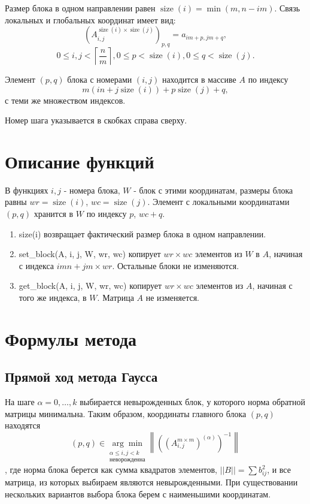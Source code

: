 \documentclass[a4paper,12pt]{article}
\newcommand{\br}[1]{\left(#1\right)}
\begin{document}
Размер блока в одном направлении равен $\operatorname{size}(i) = \min(m, n - i m)$. Связь локальных и глобальных координат имеет вид:
\[
    \left(A_{i, j}^{\operatorname{size}(i) \times \operatorname{size}(j)} \right)_{p, q} = a_{i m + p, j m + q},
\]
\[
    0 \leq i, j < \left\lceil \frac{n}{m} \right\rceil, 0 \leq p < \operatorname{size}(i), 0 \leq q < \operatorname{size}(j).
\]

Элемент $(p, q)$ блока с номерами $(i, j)$ находится в массиве $A$ по индексу
\[
    m (i n + j \operatorname{size}(i)) + p \operatorname{size}(j) + q,
\]
с теми же множеством индексов.

Номер шага указывается в скобках справа сверху.

\section{Описание функций}
В функциях $i, j$ - номера блока, $W$ - блок с этими координатам, размеры блока равны $wr = \operatorname{size}(i)$, $wc = \operatorname{size}(j)$. Элемент с локальными координатами $(p, q)$ хранится в $W$ по индексу $p$, $wc + q$.

\begin{enumerate}
    \item size(i) возвращает фактический размер блока в одном направлении.
    \item set\_block(A, i, j, W, wr, wc) копирует $wr \times wc$ элементов из $W$ в $A$, начиная с индекса $i m n + j m \times wr$. Остальные блоки не изменяются.
    \item get\_block(A, i, j, W, wr, wc) копирует $wr \times wc$ элементов из $A$, начиная с того же индекса, в $W$. Матрица $A$ не изменяется.
\end{enumerate}

\section{Формулы метода}
\subsection{Прямой ход метода Гаусса}

На шаге $\alpha = 0, \dots, k$ выбирается невырожденных блок, у которого норма обратной матрицы минимальна. Таким образом, координаты главного блока $(p, q)$ находятся
\[
    (p,q) \in \underset
    {\substack{\alpha \le i,j < k \\ \text{неворожденна}}}
    {\arg\min}
    \left\| \left(\br{A_{i,j}^{m \times m}}^{(\alpha)}\right)^{-1} \right\|
\],
где норма блока берется как сумма квадратов элементов, $\left|\left| B\right|\right| = \sum b_{ij}^2$, и все матрица, из которых выбираем являются невырожденными. При существовании нескольких вариантов выбора блока берем с наименьшими координатам.
\end{document}
